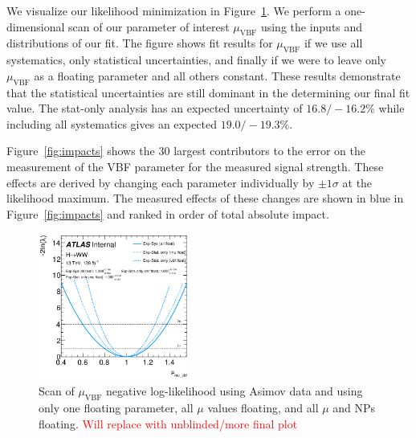 We visualize our likelihood minimization in Figure~\ref{fig:scan}. We perform a one-dimensional scan of our parameter of interest $\mu_{\text{VBF}}$ using the inputs and distributions of our fit. The figure shows fit results for $\mu_{\text{VBF}}$ if we use all systematics, only statistical uncertainties, and finally if we were to leave only $\mu_{\text{VBF}}$ as a floating parameter and all others constant. These results demonstrate that the statistical uncertainties are still dominant in the determining our final fit value. The stat-only analysis has an expected uncertainty of $16.8/-16.2\%$ while including all systematics gives an expected $19.0/-19.3\%$. 

Figure~\ref{fig:impacts} shows the 30 largest contributors to the error on the measurement of the VBF parameter for the measured signal strength. These effects are derived by changing each parameter individually by $\pm 1\sigma$ at the likelihood maximum. The measured effects of these changes are shown in blue in Figure~\ref{fig:impacts} and ranked in order of total absolute impact. 

\begin{figure}[!h]
\centering
\includegraphics[width=0.45\textwidth]{Pictures/fitresults/afterfit.png}
\caption{Scan of $\mu_{\text{VBF}}$ negative log-likelihood using Asimov data and using only one floating parameter, all $\mu$ values floating, and all $\mu$ and NPs floating. \textcolor{red}{Will replace with unblinded/more final plot}}
\label{fig:scan}
\end{figure}

